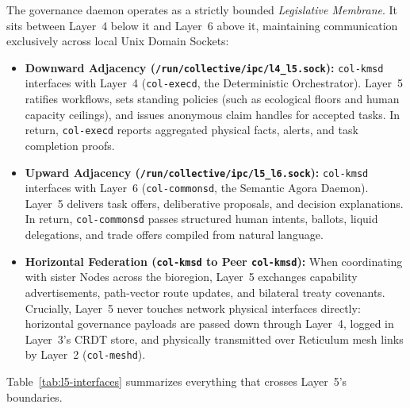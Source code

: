 The governance daemon operates as a strictly bounded \textit{Legislative Membrane}. It sits between Layer~4 below it and Layer~6 above it, maintaining communication exclusively across local Unix Domain Sockets:
\begin{itemize}
  \item \textbf{Downward Adjacency (\texttt{/run/collective/ipc/l4\_l5.sock}):} \texttt{col-kmsd} interfaces with Layer~4 (\texttt{col-execd}, the Deterministic Orchestrator). Layer~5 ratifies workflows, sets standing policies (such as ecological floors and human capacity ceilings), and issues anonymous claim handles for accepted tasks. In return, \texttt{col-execd} reports aggregated physical facts, alerts, and task completion proofs.
  \item \textbf{Upward Adjacency (\texttt{/run/collective/ipc/l5\_l6.sock}):} \texttt{col-kmsd} interfaces with Layer~6 (\texttt{col-commonsd}, the Semantic Agora Daemon). Layer~5 delivers task offers, deliberative proposals, and decision explanations. In return, \texttt{col-commonsd} passes structured human intents, ballots, liquid delegations, and trade offers compiled from natural language.
  \item \textbf{Horizontal Federation (\texttt{col-kmsd} to Peer \texttt{col-kmsd}):} When coordinating with sister Nodes across the bioregion, Layer~5 exchanges capability advertisements, path-vector route updates, and bilateral treaty covenants. Crucially, Layer~5 never touches network physical interfaces directly: horizontal governance payloads are passed down through Layer~4, logged in Layer~3's CRDT store, and physically transmitted over Reticulum mesh links by Layer~2 (\texttt{col-meshd}).
\end{itemize}

Table~\ref{tab:l5-interfaces} summarizes everything that crosses Layer~5's boundaries.

